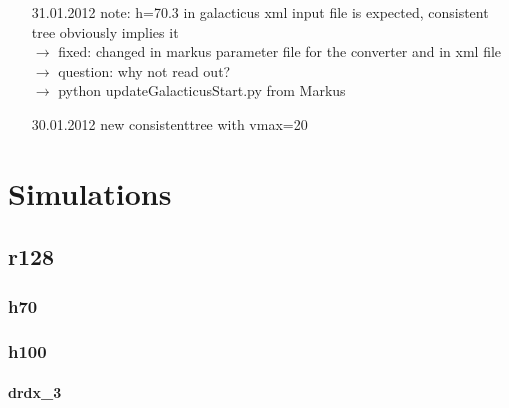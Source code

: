 \documentclass[a4paper,11pt,fleqn,oneside]{book}
\begin{document}
\begin{itemize}
\item[31.01.2012]
note: h=70.3 in galacticus xml input file is expected, consistent tree obviously implies it \\
$\rightarrow$ fixed: changed in markus parameter file for the converter and in xml file \\
$\rightarrow$ question: why not read out? \\
$\rightarrow$ python updateGalacticusStart.py from Markus 

\item[30.01.2012]
new consistenttree with vmax=20



\end{itemize}

\chapter{Simulations} %

\section{r128} %

\subsection{h70} %

\newpage
\subsection{h100} %

\subsubsection{drdx\_3} 
\end{document}
